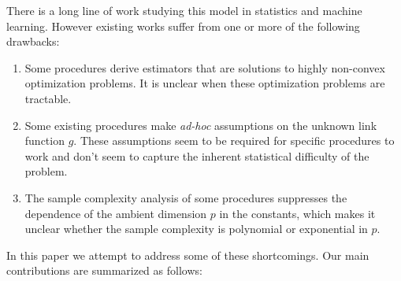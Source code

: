 \documentclass[final,12pt]{colt2018} %
\begin{document}
There is a long line of work studying this model in statistics and machine learning. However existing works suffer from one or more of the following drawbacks:
\begin{enumerate}
     \item Some procedures derive estimators that are solutions to highly non-convex optimization problems. It is unclear when these optimization problems are tractable. 
    \item Some existing procedures make \emph{ad-hoc} assumptions on the unknown link function $g$. These assumptions seem to be required for specific procedures to work and don't seem to capture the inherent statistical difficulty of the problem. 
    \item The sample complexity analysis of some procedures suppresses the dependence of the ambient dimension $p$ in the constants, which makes it unclear whether the sample complexity is polynomial or exponential in $p$. 
\end{enumerate}

In this paper we attempt to address some of these shortcomings. Our main contributions are summarized as follows: 
\end{document}
